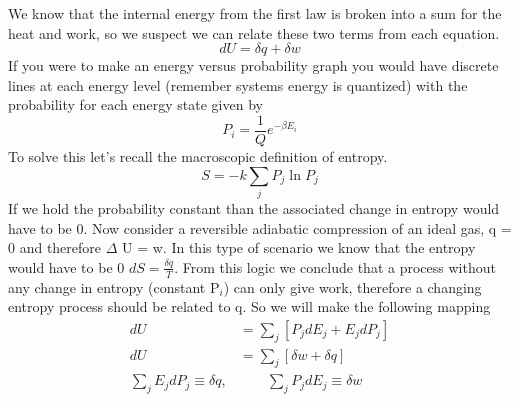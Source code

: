 \documentclass{article}
\begin{document}
We know that the internal energy from the first law is broken into a sum for the heat and work, so we suspect we can relate these two terms from each equation.
\begin{equation}
dU = \delta q + \delta w
\end{equation}
If you were to make an energy versus probability graph you would have discrete lines at each energy level (remember systems energy is quantized) with the probability for each energy state given by 
\begin{equation}
P_i = \frac{1}{Q}e^{-\beta E_i}
\end{equation}
To solve this let's recall the macroscopic definition of entropy. 
\begin{equation}
S = -k\sum_j P_j \ln P_j
\end{equation}
If we hold the probability constant than the associated change in entropy would have to be 0. 
Now consider a reversible adiabatic compression of an ideal gas, q = 0 and therefore $\Delta$ U = w. 
In this type of scenario we know that the entropy would have to be 0 $dS = \frac{\delta q}{T}$.
From this logic we conclude that a process without any change in entropy (constant P$_i$) can only give work, therefore a changing entropy process should be related to q. 
So we will make the following mapping
\begin{equation}
\begin{split}
dU &= \sum_j [ P_jdE_j + E_j dP_j ] \\ 
dU &= \sum_j [\delta w + \delta q ] \\
\sum_j E_j dP_j \equiv \delta q, &\qquad \sum_j P_jdE_j \equiv \delta w
\end{split}
\end{equation}

\end{document}
